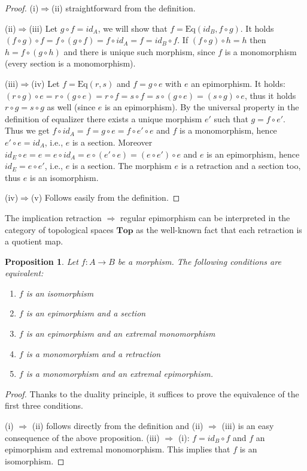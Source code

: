 \documentclass[12pt]{article}
\newcommand{\Map}[3]{#1:#2\to#3}
\newcommand{\Kat}[1]{\mathbf{#1}}
\newcommand{\Ra}{\Rightarrow}
\newcommand{\Eq}{\mathrm{Eq}}
\newtheorem{PROP}{Proposition}
\newcommand{\Top}{\Kat{Top}}
\begin{document}
\begin{proof}
(i)$\Rightarrow$(ii) straightforward from the definition.

(ii)$\Rightarrow$(iii) Let $g\circ f=id_A$, we will show that $f=\Eq(id_B,f\circ g)$. It
holds $(f\circ g)\circ f=f\circ(g\circ f)=f\circ id_A=f=id_B\circ f$. If $(f\circ g)\circ
h=h$ then $h=f\circ(g\circ h)$ and there is unique such morphism, since $f$ is a monomorphism
(every section is a monomorphism).

(iii)$\Rightarrow$(iv) Let $f=\Eq(r,s)$ and $f=g\circ e$ with $e$ an epimorphism. It holds:
$(r\circ g)\circ e=r\circ(g\circ e)=r\circ f=s\circ f=s\circ (g\circ e)=(s\circ g)\circ e$,
thus it holds $r\circ g=s\circ g$ as well (since $e$ is an epimorphism). By the universal
property in the definition of equalizer there exists a unique morphism $e'$ such that
$g=f\circ e'$. Thus we get $f\circ id_A=f=g\circ e=f\circ e'\circ e$ and $f$ is a
monomorphism, hence $e'\circ e=id_A$, i.e., $e$ is a section. Moreover $id_E\circ e=e=e\circ
id_A=e\circ(e'\circ e)=(e\circ e')\circ e$ and $e$ is an epimorphism, hence $id_E=e\circ e'$,
i.e., $e$ is a section. The morphism $e$ is a retraction and a section too, thus $e$ is an
isomorphism.

(iv)$\Rightarrow$(v) Follows easily from the definition.
\end{proof}

The implication retraction $\Ra$ regular epimorphism can be interpreted in the category of
topological spaces $\Top$ as the well-known fact that each retraction is a quotient map.

\begin{PROP} \label{EKVEPODMPREIZOM}
Let $\Map fAB$ be a morphism. The following conditions are equivalent:
  \begin{enumerate}
  \renewcommand{\labelenumi}{(\roman{enumi})}
    \item $f$ is an isomorphism
    \item $f$ is an epimorphism and a section
    \item $f$ is an epimorphism and an extremal monomorphism
    \item $f$ is a monomorphism and a retraction
    \item $f$ is a monomorphism and an extremal epimorphism.
  \end{enumerate}
\end{PROP}

\begin{proof}
Thanks to the duality principle, it suffices to prove the equivalence of the first three conditions.

(i) $\Rightarrow$ (ii) follows directly from the definition and (ii) $\Rightarrow$ (iii) is
an easy consequence of the above proposition. (iii) $\Rightarrow$ (i): $f=id_B\circ f$ and
$f$ an epimorphism and  extremal monomorphism. This implies that $f$ is an isomorphism.
\end{proof}
\end{document}
